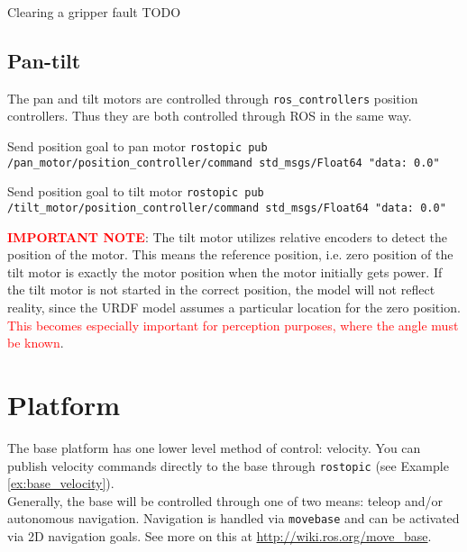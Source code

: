 \begin{example}{Clearing a gripper fault}
  \label{ex:gripper_fault_ack}
  TODO
\end{example}

\subsection{Pan-tilt}
The pan and tilt motors are controlled through \texttt{ros\_controllers} position controllers. 
Thus they are both controlled through ROS in the same way.

\begin{example}{Send position goal to pan motor}
  \label{ex:pan_pos_goal}
    \texttt{rostopic pub /pan\_motor/position\_controller/command std\_msgs/Float64 "data: 0.0"} \\
\end{example}

\begin{example}{Send position goal to tilt motor}
  \label{ex:tilt_pos_goal}
    \texttt{rostopic pub /tilt\_motor/position\_controller/command std\_msgs/Float64 "data: 0.0"} \\
\end{example}

\textcolor{red}{\textbf{IMPORTANT NOTE}}: The tilt motor utilizes relative encoders to detect the position of the motor. 
This means the reference position, i.e. zero position of the tilt motor is exactly the motor position when the motor initially gets power. 
If the tilt motor is not started in the correct position, the model will not reflect reality, since the URDF model assumes a particular location for the zero position. 
\textcolor{red}{This becomes especially important for perception purposes, where the angle must be known}.

\section{Platform}
The base platform has one lower level method of control: velocity. 
You can publish velocity commands directly to the base through \texttt{rostopic} (see Example \ref{ex:base_velocity}). \\

Generally, the base will be controlled through one of two means: teleop and/or autonomous navigation. 
Navigation is handled via \texttt{movebase} and can be activated via 2D navigation goals. 
See more on this at \href{http://wiki.ros.org/move_base}{http://wiki.ros.org/move\_base}.


